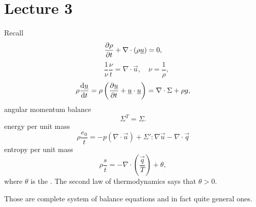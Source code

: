 \documentclass[../main.tex]{subfiles}
\begin{document}
  \chapter{Lecture 3}

    Recall
    \begin{displaymath}
      \frac{\partial \rho}{\partial t} + \nabla \cdot (\rho \underline{u}) = 0,  
    \end{displaymath}
    \begin{equation}
      \quad \frac{1}{\nu} \dfrac{\nu}{t} = \nabla \cdot \vec u, 
      \quad \nu = \frac{1}{\rho},
      \label{eq:3.1}
    \end{equation}
    \begin{displaymath}
      \rho \frac{\mathrm{d} \underline{u} }{\mathrm{d} t} = \rho \left(  \frac{\partial \underline{u}}{\partial t} + \underline{u} \cdot \underline{u} \right) = \nabla \cdot \Sigma  + \rho g,
    \end{displaymath}
    angular momentum balance
    \begin{displaymath}
      \Sigma^T = \Sigma.
    \end{displaymath}
    energy per unit mass
    \begin{equation}
      \rho \dfrac{e_0}{t} = - p (\nabla \cdot \vec u) + \Sigma' : \nabla \vec u - \nabla \cdot \vec q
      \label{eq:3.2}
    \end{equation}
    entropy per unit mass
    \begin{displaymath}
      \rho \dfrac{s}{t} = - \nabla \cdot \left( \frac{\vec q }{T} \right) + \theta,
    \end{displaymath}
    where $\theta$ is the . The second law of thermodynamics says that $\theta > 0 $.

    Those are complete system of balance equations and in fact quite general ones.
\end{document}
